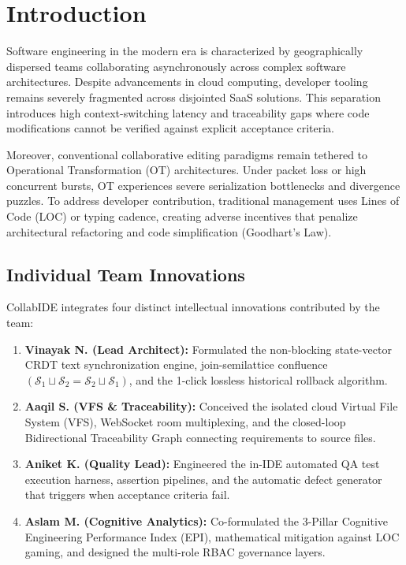 \documentclass[conference]{IEEEtran}
\begin{document}
\section{Introduction}
Software engineering in the modern era is characterized by geographically dispersed teams collaborating asynchronously across complex software architectures. Despite advancements in cloud computing, developer tooling remains severely fragmented across disjointed SaaS solutions. This separation introduces high context-switching latency and traceability gaps where code modifications cannot be verified against explicit acceptance criteria.

Moreover, conventional collaborative editing paradigms remain tethered to Operational Transformation (OT) architectures. Under packet loss or high concurrent bursts, OT experiences severe serialization bottlenecks and divergence puzzles. To address developer contribution, traditional management uses Lines of Code (LOC) or typing cadence, creating adverse incentives that penalize architectural refactoring and code simplification (Goodhart's Law).

\subsection{Individual Team Innovations}
CollabIDE integrates four distinct intellectual innovations contributed by the team:
\begin{enumerate}
    \item \textbf{Vinayak N. (Lead Architect):} Formulated the non-blocking state-vector CRDT text synchronization engine, join-semilattice confluence $(\mathcal{S}_1 \sqcup \mathcal{S}_2 = \mathcal{S}_2 \sqcup \mathcal{S}_1)$, and the 1-click lossless historical rollback algorithm.
    \item \textbf{Aaqil S. (VFS \& Traceability):} Conceived the isolated cloud Virtual File System (VFS), WebSocket room multiplexing, and the closed-loop Bidirectional Traceability Graph connecting requirements to source files.
    \item \textbf{Aniket K. (Quality Lead):} Engineered the in-IDE automated QA test execution harness, assertion pipelines, and the automatic defect generator that triggers when acceptance criteria fail.
    \item \textbf{Aslam M. (Cognitive Analytics):} Co-formulated the 3-Pillar Cognitive Engineering Performance Index (EPI), mathematical mitigation against LOC gaming, and designed the multi-role RBAC governance layers.
\end{enumerate}
\end{document}
